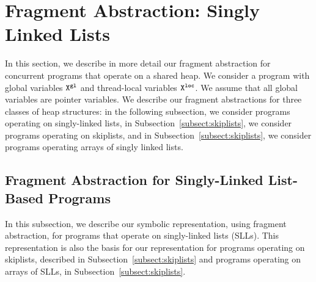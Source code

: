 \section{Fragment Abstraction: Singly Linked Lists}
\label{sec:fragment-abstraction}
In this section, we describe in more detail our fragment abstraction for
concurrent programs that operate on a shared heap.
We consider a program with global variables ${\tt X}^{\tt gl}$ and
thread-local variables ${\tt X}^{\tt loc}$.
We assume that all global variables are pointer variables.
We describe our fragment abstractions for three classes of heap structures:
in the following subsection, we consider programs operating on singly-linked
lists, in Subsection~\ref{subsect:skiplists}, we consider programs operating
on skiplists, and in
Subsection~\ref{subsect:skiplists}, we consider programs operating
arrays of singly linked lists.



\subsection{Fragment Abstraction for Singly-Linked List-Based Programs}
\label{subsec:frag-sll}
In this subsection, we describe our symbolic representation, using fragment
abstraction, for programs that operate on singly-linked lists (SLLs). This
representation is also the basis for our representation for programs
operating on skiplists, described in Subsection~\ref{subsect:skiplists}
and programs operating on arrays of SLLs, in Subsection~\ref{subsect:skiplists}.


